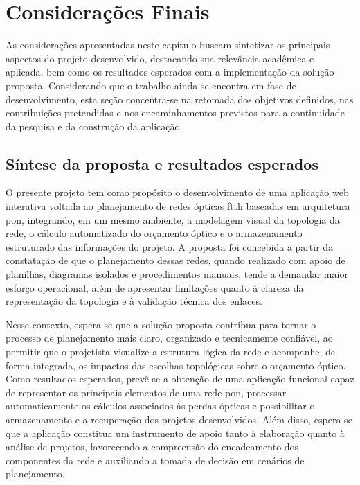 \chapter{Considerações Finais}

As considerações apresentadas neste capítulo buscam sintetizar os principais aspectos do projeto desenvolvido, destacando sua relevância acadêmica e aplicada, bem como os resultados esperados com a implementação da solução proposta. Considerando que o trabalho ainda se encontra em fase de desenvolvimento, esta seção concentra-se na retomada dos objetivos definidos, nas contribuições pretendidas e nos encaminhamentos previstos para a continuidade da pesquisa e da construção da aplicação.

\section{Síntese da proposta e resultados esperados}

O presente projeto tem como propósito o desenvolvimento de uma aplicação web interativa voltada ao planejamento de redes ópticas \gls{ftth} baseadas em arquitetura \gls{pon}, integrando, em um mesmo ambiente, a modelagem visual da topologia da rede, o cálculo automatizado do orçamento óptico e o armazenamento estruturado das informações do projeto. A proposta foi concebida a partir da constatação de que o planejamento dessas redes, quando realizado com apoio de planilhas, diagramas isolados e procedimentos manuais, tende a demandar maior esforço operacional, além de apresentar limitações quanto à clareza da representação da topologia e à validação técnica dos enlaces.

Nesse contexto, espera-se que a solução proposta contribua para tornar o processo de planejamento mais claro, organizado e tecnicamente confiável, ao permitir que o projetista visualize a estrutura lógica da rede e acompanhe, de forma integrada, os impactos das escolhas topológicas sobre o orçamento óptico. Como resultados esperados, prevê-se a obtenção de uma aplicação funcional capaz de representar os principais elementos de uma rede \gls{pon}, processar automaticamente os cálculos associados às perdas ópticas e possibilitar o armazenamento e a recuperação dos projetos desenvolvidos. Além disso, espera-se que a aplicação constitua um instrumento de apoio tanto à elaboração quanto à análise de projetos, favorecendo a compreensão do encadeamento dos componentes da rede e auxiliando a tomada de decisão em cenários de planejamento.

